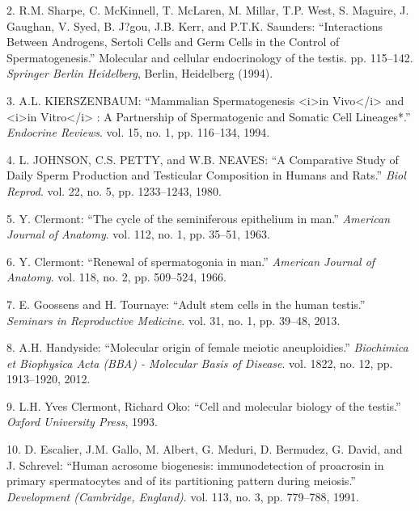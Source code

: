 \documentclass[12pt,twoside]{reedthesis}
\theoremstyle{definition}
\theoremstyle{definition}
\theoremstyle{remark}
\begin{document}
  \hypertarget{ref-Sharpe1994}{}
  2. R.M. Sharpe, C. McKinnell, T. McLaren, M. Millar, T.P. West, S.
  Maguire, J. Gaughan, V. Syed, B. J?gou, J.B. Kerr, and P.T.K. Saunders:
  ``Interactions Between Androgens, Sertoli Cells and Germ Cells in the
  Control of Spermatogenesis.'' Molecular and cellular endocrinology of
  the testis. pp. 115--142. \emph{Springer Berlin Heidelberg}, Berlin,
  Heidelberg (1994).
  
  \hypertarget{ref-KIERSZENBAUM1994}{}
  3. A.L. KIERSZENBAUM: ``Mammalian Spermatogenesis
  \textless{}i\textgreater{}in Vivo\textless{}/i\textgreater{} and
  \textless{}i\textgreater{}in Vitro\textless{}/i\textgreater{} : A
  Partnership of Spermatogenic and Somatic Cell Lineages*.''
  \emph{Endocrine Reviews}. vol. 15, no. 1, pp. 116--134, 1994.
  
  \hypertarget{ref-Johnson1980}{}
  4. L. JOHNSON, C.S. PETTY, and W.B. NEAVES: ``A Comparative Study of
  Daily Sperm Production and Testicular Composition in Humans and Rats.''
  \emph{Biol Reprod}. vol. 22, no. 5, pp. 1233--1243, 1980.
  
  \hypertarget{ref-Clermont1963}{}
  5. Y. Clermont: ``The cycle of the seminiferous epithelium in man.''
  \emph{American Journal of Anatomy}. vol. 112, no. 1, pp. 35--51, 1963.
  
  \hypertarget{ref-Clermont1966}{}
  6. Y. Clermont: ``Renewal of spermatogonia in man.'' \emph{American
  Journal of Anatomy}. vol. 118, no. 2, pp. 509--524, 1966.
  
  \hypertarget{ref-Goossens2013}{}
  7. E. Goossens and H. Tournaye: ``Adult stem cells in the human
  testis.'' \emph{Seminars in Reproductive Medicine}. vol. 31, no. 1, pp.
  39--48, 2013.
  
  \hypertarget{ref-Handyside2012}{}
  8. A.H. Handyside: ``Molecular origin of female meiotic aneuploidies.''
  \emph{Biochimica et Biophysica Acta (BBA) - Molecular Basis of Disease}.
  vol. 1822, no. 12, pp. 1913--1920, 2012.
  
  \hypertarget{ref-YvesClermontRichardOko1993}{}
  9. L.H. Yves Clermont, Richard Oko: ``Cell and molecular biology of the
  testis.'' \emph{Oxford University Press}, 1993.
  
  \hypertarget{ref-Escalier1991}{}
  10. D. Escalier, J.M. Gallo, M. Albert, G. Meduri, D. Bermudez, G.
  David, and J. Schrevel: ``Human acrosome biogenesis: immunodetection of
  proacrosin in primary spermatocytes and of its partitioning pattern
  during meiosis.'' \emph{Development (Cambridge, England)}. vol. 113, no.
  3, pp. 779--788, 1991.
  
\end{document}
